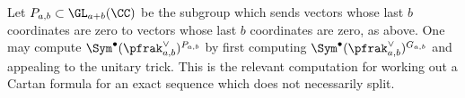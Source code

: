 \begin{exercise}\label{exercise-Pab}
	Let $P_{a,b}\subset \GL_{a+b}(\CC)$ be the subgroup which sends vectors whose last $b$ coordinates are zero to vectors whose last $b$ coordinates are zero, as above. One may compute $
		\Sym^\bullet(\pfrak^\vee_{a,b})^{P_{a,b}}$
	by first computing $
		\Sym^\bullet(\pfrak^\vee_{a,b})^{G_{a,b}}$ 
	and appealing to the unitary trick. 
This is the relevant computation for working out a Cartan formula for an exact sequence which does not necessarily split.
\end{exercise}
